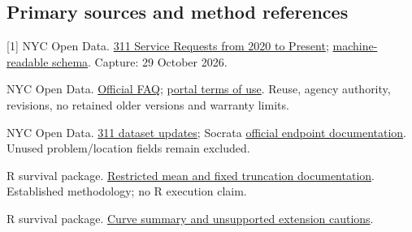 \documentclass[10pt,letterpaper]{article}
\begin{document}
\subsection*{Primary sources and method references}
{\footnotesize
[1] NYC Open Data. \href{https://data.cityofnewyork.us/Social-Services/311-Service-Requests-from-2020-to-Present/erm2-nwe9}{311 Service Requests from 2020 to Present}; \href{https://data.cityofnewyork.us/api/views/erm2-nwe9.json}{machine-readable schema}. Capture: 29 October 2026.\par
[2] NYC Open Data. \href{https://www.nyc.gov/opendata/get-started/FAQs}{Official FAQ}; \href{https://data.cityofnewyork.us/stories/s/Terms-of-Use/k9k7-3cje}{portal terms of use}. Reuse, agency authority, revisions, no retained older versions and warranty limits.\par
[3] NYC Open Data. \href{https://www.nyc.gov/opendata/news/all-news/311-Service-Requests-Updates}{311 dataset updates}; Socrata \href{https://dev.socrata.com/foundry/data.cityofnewyork.us/erm2-nwe9}{official endpoint documentation}. Unused problem/location fields remain excluded.\par
[4] R survival package. \href{https://stat.ethz.ch/R-manual/R-devel/library/survival/html/print.survfit.html}{Restricted mean and fixed truncation documentation}. Established methodology; no R execution claim.\par
[5] R survival package. \href{https://stat.ethz.ch/R-manual/R-devel/library/survival/html/summary.survfit.html}{Curve summary and unsupported extension cautions}.\par
}
\end{document}
